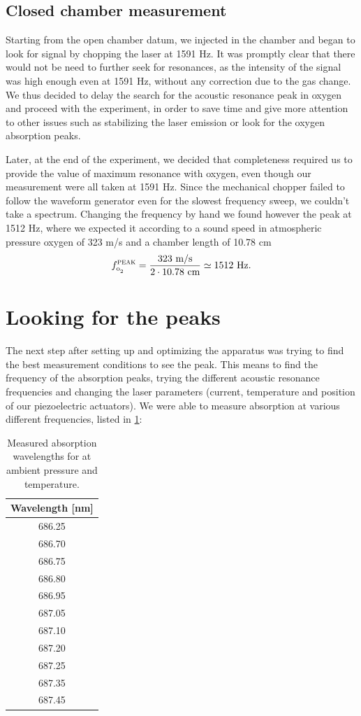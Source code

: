 		\subsection{Closed chamber measurement}
Starting from the open chamber datum, we injected  in the chamber and began to look for signal by chopping the laser at 1591 Hz. It was promptly clear that there would not be need to further seek for resonances, as the intensity of the signal was high enough even at 1591 Hz, without any correction due to the gas change. We thus decided to delay the search for the acoustic resonance peak in oxygen and proceed with the experiment, in order to save time and give more attention to other issues such as stabilizing the laser emission or look for the oxygen absorption peaks.

Later, at the end of the experiment, we decided that completeness required us to provide the value of maximum resonance with oxygen, even though our measurement were all taken at 1591 Hz. Since the mechanical chopper failed to follow the waveform generator even for the slowest frequency sweep, we couldn't take a spectrum. Changing the frequency by hand we found however the peak at 1512 Hz, where we expected it according to a sound speed in atmospheric pressure oxygen of 323 m/s and a chamber length of 10.78 cm$$f^{\mai{peak}}_{\ce{o2}}=\frac{323\mbox{ m/s}}{2\cdot10.78\mbox{ cm}}\simeq1512\mbox{ Hz.}$$

\section{Looking for the \texorpdfstring{}{oxygen} peaks}\label{oxygen}
The next step after setting up and optimizing the apparatus was trying to find the best measurement conditions to see the peak. This means to find the frequency of the  absorption peaks, trying the different acoustic resonance frequencies and changing the laser parameters (current, temperature and position of our piezoelectric actuators). 
We were able to measure absorption at various different frequencies, listed in \cref{oxypeaks}:

\begin{table}\centering
\begin{tabular}{|c|}
\hline Wavelength [nm]\\ \hline
686.25 \\ \hline
686.70 \\ \hline
686.75 \\ \hline
686.80 \\ \hline
686.95 \\ \hline
687.05 \\ \hline
687.10 \\ \hline
687.20 \\ \hline
687.25 \\ \hline
687.35 \\ \hline
687.45 \\ \hline
\end{tabular}
\caption{Measured absorption wavelengths for  at ambient pressure and temperature.}
\label{oxypeaks}
\end{table}

